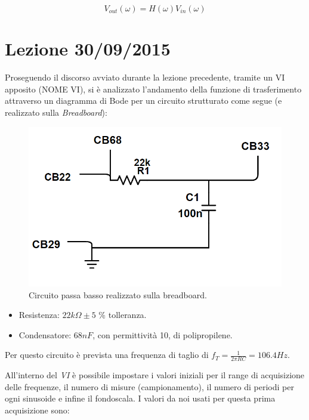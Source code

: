 \documentclass[journal, a4paper]{IEEEtran}
\begin{document}
\begin{equation}
V_{out}(\omega)= H(\omega)V_{in}(\omega)
\end{equation}


\section{Lezione 30/09/2015}
Proseguendo il discorso avviato durante la lezione precedente, tramite un VI apposito (NOME VI), si è analizzato l'andamento della funzione di trasferimento attraverso un diagramma di Bode per un circuito strutturato come segue (e realizzato sulla \textit{Breadboard}):\\


\begin{figure}
\centering
\includegraphics[width=0.9\linewidth]{./breadboard1_passabasso}
\caption{Circuito passa basso realizzato sulla breadboard.}
\label{fig:breadboard_1}
\end{figure}


\begin{itemize}
\item Resistenza: $22 k\Omega \pm 5 $ \% tolleranza.
\item Condensatore: $68\si{nF}$, con permittività 10, di polipropilene.\\
\end{itemize}


Per questo circuito è prevista una frequenza di taglio di $f_T =\frac{1}{2\pi RC} = 106.4 \si{Hz}$.

All'interno del \textit{VI} è possibile impostare i valori iniziali per il range di acquisizione delle frequenze, il numero di misure (campionamento), il numero di periodi per ogni sinusoide e infine il fondoscala. I valori da noi usati per questa prima acquisizione sono:
\\
\end{document}
